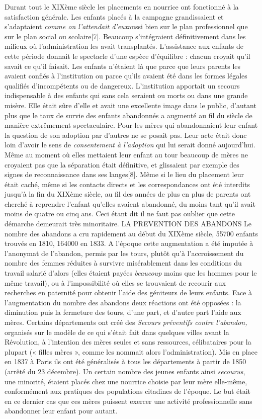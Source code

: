  Durant tout le XIXème siècle les placements en nourrice ont fonctionné à la satisfaction générale. Les enfants placés à la campagne grandissaient et s'adaptaient \emph{comme on l'attendait d'eux}aussi bien sur le plan professionnel que sur le plan social ou scolaire[7]. Beaucoup s'intégraient définitivement dans les milieux où l'administration les avait transplantés. L'assistance aux enfants de cette période donnait le spectacle d'une espèce d'équilibre : chacun croyait qu'il savait ce qu'il faisait. Les enfants n'étaient là que parce que leurs parents les avaient confiés à l'institution ou parce qu'ils avaient été dans les formes légales qualifiés d'incompétents ou de dangereux. L'institution apportait un secours indispensable à des enfants qui sans cela seraient ou morts ou dans une grande misère. Elle était sûre d'elle et avait une excellente image dans le public, d'autant plus que le taux de survie des enfants abandonnés a augmenté au fil du siècle de manière extrêmement spectaculaire.
 Pour les mères qui abandonnaient leur enfant la question de son adoption par d'autres ne se posait pas. Leur acte était donc loin d'avoir le sens de \emph{consentement à l'adoption} qui lui serait donné aujourd'hui. Même au moment où elles mettaient leur enfant au tour beaucoup de mères ne croyaient pas que la séparation était définitive, et glissaient par exemple des signes de reconnaissance dans ses langes[8]. Même si le lieu du placement leur était caché, même si les contacts directs et les correspondances ont été interdits jusqu'à la fin du XIXème siècle, au fil des années de plus en plus de parents ont cherché à reprendre l'enfant qu'elles avaient abandonné, du moins tant qu'il avait moins de quatre ou cinq ans. Ceci étant dit il ne faut pas oublier que cette démarche demeurait très minoritaire.
LA PREVENTION DES ABANDONS
 Le nombre des abandons a cru rapidement au début du XIXème siècle, 55700 enfants trouvés en 1810, 164000 en 1833. A l'époque cette augmentation a été imputée à l'anonymat de l'abandon, permis par les tours, plutôt qu'à l'accroissement du nombre des femmes réduites à survivre misérablement dans les conditions du travail salarié d'alors (elles étaient payées \emph{beaucoup} moins que les hommes pour le même travail), ou à l'impossibilité où elles se trouvaient de recourir aux recherches en paternité pour obtenir l'aide des géniteurs de leurs enfants.
 Face à l'augmentation du nombre des abandons deux réactions ont été opposées : la diminution puis la fermeture des tours, d'une part, et d'autre part l'aide aux mères. Certains départements ont créé des \emph{Secours préventifs contre l'abandon,} organisés sur le modèle de ce qui s'était fait dans quelques villes avant la Révolution, à l'intention des mères seules et sans ressources, célibataires pour la plupart (« filles mères », comme les nommait alors l'administration). Mis en place en 1837 à Paris ils ont été généralisés à tous les départements à partir de 1850 (arrêté du 23 décembre). Un certain nombre des jeunes enfants ainsi \emph{secourus}, une minorité, étaient placés chez une nourrice choisie par leur mère elle-même, conformément aux pratiques des populations citadines de l'époque. Le but était en ce dernier cas que ces mères puissent exercer une activité professionnelle sans abandonner leur enfant pour autant.
